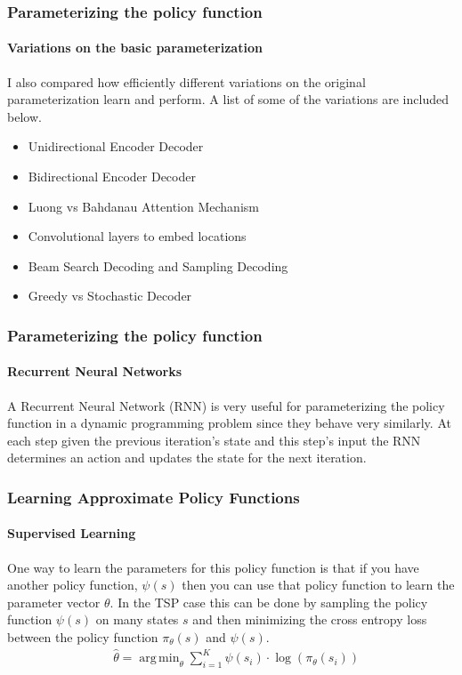 \documentclass{beamer}
\DeclareMathOperator*{\argmin}{arg\,min}
\begin{document}
\begin{frame}
  \frametitle{Parameterizing the policy function}
  \framesubtitle{Variations on the basic parameterization}
  I also compared how efficiently different variations on the original parameterization learn and perform. A list of some of the variations are included below.
  \begin{itemize}
  \item Unidirectional Encoder Decoder\\
  \item Bidirectional Encoder Decoder\\
  \item Luong vs Bahdanau Attention Mechanism\\
  \item Convolutional layers to embed locations\\
  \item Beam Search Decoding and Sampling Decoding\\
  \item Greedy vs Stochastic Decoder
  \end{itemize}
\end{frame}


\begin{frame}
  \frametitle{Parameterizing the policy function}
  \framesubtitle{Recurrent Neural Networks}
  A Recurrent Neural Network (RNN) is very useful for parameterizing the policy function in a dynamic programming problem since they behave very similarly. At each step given the previous iteration's state and this step's input the RNN determines an action and updates the state for the next iteration.
  \begin{figure}[H]
    \centering
  \end{figure}
\end{frame}


\begin{frame}
  \frametitle{Learning Approximate Policy Functions}
  \framesubtitle{Supervised Learning}

  One way to learn the parameters for this policy function is that if you have another policy function, $\psi(s)$ then you can use that policy function to learn the parameter vector $\theta$. In the TSP case this can be done by sampling the policy function $\psi(s)$ on many states $s$ and then minimizing the cross entropy loss between the policy function $\pi_\theta(s)$ and $\psi(s)$.
  \begin{align*}
    &\hat{\theta}=\argmin_{\theta}{\sum_{i=1}^K \psi(s_i)\cdot \log(\pi_\theta(s_i))}
  \end{align*}
\end{frame}
\end{document}
